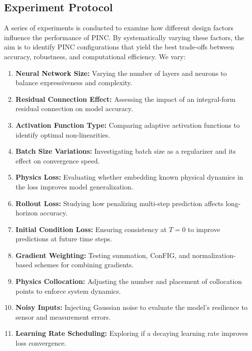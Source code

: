 \subsection{Experiment Protocol}
A series of experiments is conducted to examine how different design factors influence the performance of PINC. By systematically varying these factors, the aim is to identify PINC configurations that yield the best trade-offs between accuracy, robustness, and computational efficiency. We vary:
\begin{enumerate}

    \item \textbf{Neural Network Size:} 
        Varying the number of layers and neurons to balance expressiveness and complexity.
    
    \item \textbf{Residual Connection Effect:} 
        Assessing the impact of an integral-form residual connection on model accuracy.
    
    \item \textbf{Activation Function Type:} 
        Comparing adaptive activation functions to identify optimal non-linearities.
    
    \item \textbf{Batch Size Variations:}
    Investigating batch size as a regularizer and its effect on convergence speed.
    
    \item \textbf{Physics Loss:} 
        Evaluating whether embedding known physical dynamics in the loss improves model generalization.
    
    \item \textbf{Rollout Loss:}
    Studying how penalizing multi-step prediction affects long-horizon accuracy.
    
    \item \textbf{Initial Condition Loss:}
        Ensuring consistency at $T=0$ to improve predictions at future time steps.
    
    
    \item \textbf{Gradient Weighting:}
        Testing summation, ConFIG, and normalization-based schemes for combining gradients.
    
    \item \textbf{Physics Collocation:}
    Adjusting the number and placement of collocation points to enforce system dynamics.
    
    \item \textbf{Noisy Inputs:}
    Injecting Gaussian noise to evaluate the model’s resilience to sensor and measurement errors.
    
    \item \textbf{Learning Rate Scheduling:}
    Exploring if a decaying learning rate improves loss convergence.
    
\end{enumerate}


